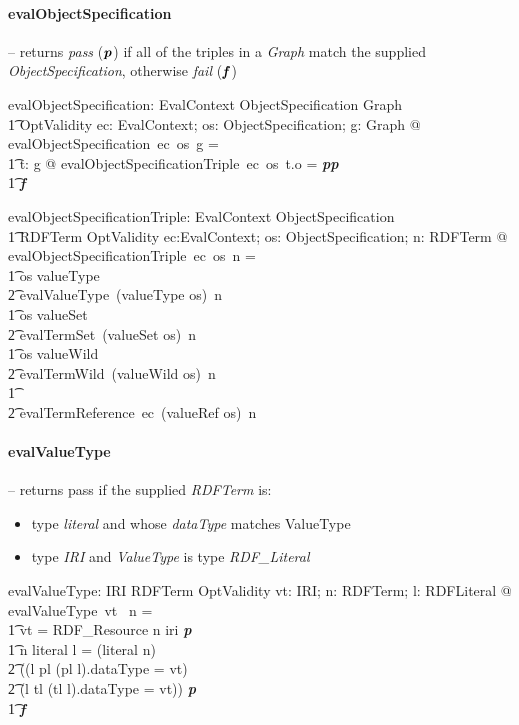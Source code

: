 \documentclass[fuzz]{llncs}
\def\entryFor{\cdot}
\def\pass{\textbf{\textit{p}}}
\def\fail{\textbf{\textit{f}}}
\def\zc{\textit}
\begin{document}
\paragraph{evalObjectSpecification} -- returns \zc{pass} ($\pass$) if all of the triples in a \zc{Graph} 
match the supplied \zc{ObjectSpecification}, otherwise \zc{fail} ($\fail$)
\begin{gendef}
   evalObjectSpecification: EvalContext \fun ObjectSpecification \fun Graph \fun \\
\t1 OptValidity
\where
   \forall ec: EvalContext; os: ObjectSpecification; g: Graph @ \\ evalObjectSpecification~ec~os~g = \\
\t1 \IF \forall t: g @ evalObjectSpecificationTriple~ec~os~t.o = \pass \THEN \pass \\
\t1 \ELSE \fail
\end{gendef}
\begin{gendef}
   evalObjectSpecificationTriple: EvalContext \fun ObjectSpecification \fun \\
\t1 RDFTerm \fun OptValidity
\where
   \forall ec:EvalContext; os: ObjectSpecification; n: RDFTerm @ \\
  evalObjectSpecificationTriple~ec~os~n = \\
\t1 \IF os \in \ran valueType \THEN \\
\t2 evalValueType~(valueType \entryFor os)~n \\
\t1 \ELSE \IF os \in \ran valueSet \THEN \\
\t2 evalTermSet~(valueSet \entryFor os)~n \\
\t1 \ELSE \IF os \in \ran valueWild \THEN \\
\t2 evalTermWild~(valueWild \entryFor os)~n \\
\t1 \ELSE \\
\t2 evalTermReference~ec~(valueRef \entryFor os)~n
\end{gendef}


\paragraph{evalValueType} -- returns pass if the supplied \zc{RDFTerm} is:
\begin{itemize}
\item type \zc{literal} and whose \zc{dataType} matches ValueType
\item type \zc{IRI} and \zc{ValueType} is type \zc{RDF\_Literal}
\end{itemize}
\begin{gendef}
   evalValueType: IRI \pfun RDFTerm \pfun OptValidity
\where
   \forall vt: IRI; n: RDFTerm; l: RDFLiteral @ evalValueType~vt~ n = \\
\t1 \IF vt = RDF\_Resource \land  n \in \ran iri \THEN \pass \\
\t1 \ELSE \IF n \in \ran literal \land l = (literal \entryFor n) \land \\
\t2 ((l \in \ran pl \land (pl \entryFor l).dataType = vt) \lor \\
\t2  (l \in \ran tl \land (tl \entryFor l).dataType = vt)) \THEN \pass \\
\t1 \ELSE \fail
\end{gendef}
\end{document}
